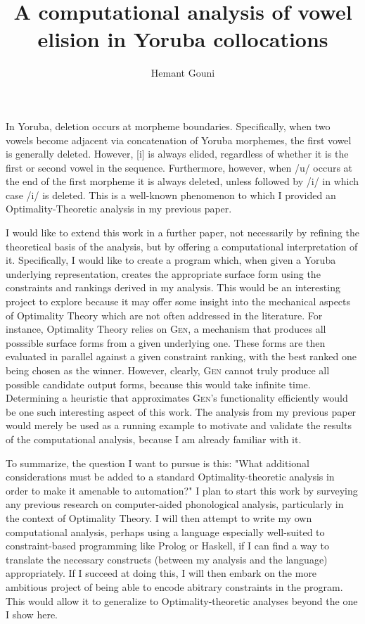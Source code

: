\documentclass[12pt]{article}
\title{A computational analysis of vowel elision in Yoruba collocations}
\author{Hemant Gouni}
\begin{document}
\maketitle


In Yoruba, deletion occurs at morpheme boundaries. Specifically, when two
vowels become adjacent via concatenation of Yoruba morphemes, the first vowel
is generally deleted. However, [i] is always elided, regardless of whether it
is the first or second vowel in the sequence. Furthermore, however, when /u/
occurs at the end of the first morpheme it is always deleted, unless followed
by /i/ in which case /i/ is deleted. This is a well-known phenomenon to which
I provided an Optimality-Theoretic analysis in my previous paper.

I would like to extend this work in a further paper, not necessarily by
refining the theoretical basis of the analysis, but by offering a computational
interpretation of it. Specifically, I would like to create a program which,
when given a Yoruba underlying representation, creates the appropriate surface
form using the constraints and rankings derived in my analysis. This would be
an interesting project to explore because it may offer some insight into the
mechanical aspects of Optimality Theory which are not often addressed in the
literature. For instance, Optimality Theory relies on \textsc{Gen}, a mechanism
that produces all posssible surface forms from a given underlying one. These
forms are then evaluated in parallel against a given constraint ranking, with
the best ranked one being chosen as the winner. However, clearly, \textsc{Gen}
cannot truly produce all possible candidate output forms, because this would
take infinite time. Determining a heuristic that approximates \textsc{Gen}'s
functionality efficiently would be one such interesting aspect of this work.
The analysis from my previous paper would merely be used as a running example
to motivate and validate the results of the computational analysis, because I
am already familiar with it.

To summarize, the question I want to pursue is this: "What additional
considerations must be added to a standard Optimality-theoretic analysis in
order to make it amenable to automation?" I plan to start this work by
surveying any previous research on computer-aided phonological analysis,
particularly in the context of Optimality Theory. I will then attempt to write
my own computational analysis, perhaps using a language especially well-suited
to constraint-based programming like Prolog or Haskell, if I can find a way to
translate the necessary constructs (between my analysis and the language)
appropriately. If I succeed at doing this, I will then embark on the more
ambitious project of being able to encode abitrary constraints in the program.
This would allow it to generalize to Optimality-theoretic analyses beyond the
one I show here.
\end{document}
